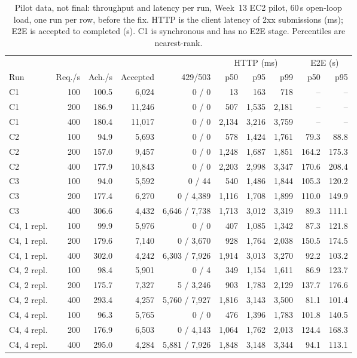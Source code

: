 \documentclass[a4paper]{report}
\begin{document}
\begin{table}[tbp]
\centering
\scriptsize
\caption{Pilot data, not final: throughput and latency per run, Week~13 EC2
pilot, 60\,s open-loop load, one run per row, before the fix. HTTP is the
client latency of 2xx submissions (ms); E2E is accepted to completed (s). C1 is
synchronous and has no E2E stage. Percentiles are nearest-rank.}
\label{tab:pilot-latency}
\begin{adjustbox}{max width=\linewidth}
\begin{tabular}{@{}lrrrrrrrrr@{}}
\toprule
 & & & & & \multicolumn{3}{c}{HTTP (ms)} & \multicolumn{2}{c}{E2E (s)} \\
\cmidrule(lr){6-8}\cmidrule(l){9-10}
Run & Req./s & Ach./s & Accepted & 429/503 & p50 & p95 & p99 & p50 & p95 \\
\midrule
C1 & 100 & 100.5 & 6,024 & 0 / 0 & 13 & 163 & 718 & -- & -- \\
C1 & 200 & 186.9 & 11,246 & 0 / 0 & 507 & 1,535 & 2,181 & -- & -- \\
C1 & 400 & 180.4 & 11,017 & 0 / 0 & 2,134 & 3,216 & 3,759 & -- & -- \\
C2 & 100 & 94.9 & 5,693 & 0 / 0 & 578 & 1,424 & 1,761 & 79.3 & 88.8 \\
C2 & 200 & 157.0 & 9,457 & 0 / 0 & 1,248 & 1,687 & 1,851 & 164.2 & 175.3 \\
C2 & 400 & 177.9 & 10,843 & 0 / 0 & 2,203 & 2,998 & 3,347 & 170.6 & 208.4 \\
C3 & 100 & 94.0 & 5,592 & 0 / 44 & 540 & 1,486 & 1,844 & 105.3 & 120.2 \\
C3 & 200 & 177.4 & 6,270 & 0 / 4,389 & 1,116 & 1,708 & 1,899 & 110.0 & 149.9 \\
C3 & 400 & 306.6 & 4,432 & 6,646 / 7,738 & 1,713 & 3,012 & 3,319 & 89.3 & 111.1 \\
C4, 1 repl. & 100 & 99.9 & 5,976 & 0 / 0 & 407 & 1,085 & 1,342 & 87.3 & 121.8 \\
C4, 1 repl. & 200 & 179.6 & 7,140 & 0 / 3,670 & 928 & 1,764 & 2,038 & 150.5 & 174.5 \\
C4, 1 repl. & 400 & 302.0 & 4,242 & 6,303 / 7,926 & 1,914 & 3,013 & 3,270 & 92.2 & 103.2 \\
C4, 2 repl. & 100 & 98.4 & 5,901 & 0 / 4 & 349 & 1,154 & 1,611 & 86.9 & 123.7 \\
C4, 2 repl. & 200 & 175.7 & 7,327 & 5 / 3,246 & 903 & 1,783 & 2,129 & 137.7 & 176.6 \\
C4, 2 repl. & 400 & 293.4 & 4,257 & 5,760 / 7,927 & 1,816 & 3,143 & 3,500 & 81.1 & 101.4 \\
C4, 4 repl. & 100 & 96.3 & 5,765 & 0 / 0 & 476 & 1,396 & 1,783 & 101.8 & 140.5 \\
C4, 4 repl. & 200 & 176.9 & 6,503 & 0 / 4,143 & 1,064 & 1,762 & 2,013 & 124.4 & 168.3 \\
C4, 4 repl. & 400 & 295.0 & 4,284 & 5,881 / 7,926 & 1,848 & 3,148 & 3,344 & 94.1 & 113.1 \\
\bottomrule
\end{tabular}
\end{adjustbox}
\end{table}
\end{document}
